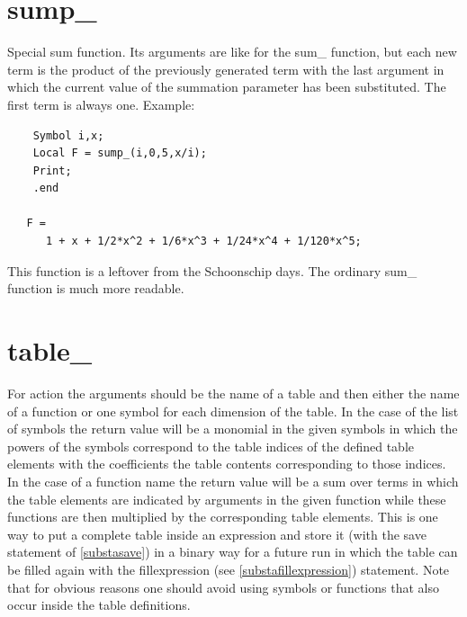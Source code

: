 
\section{sump\_}
\label{funsump}
\noindent Special sum function. Its arguments are like for the 
sum\_ function, but each new term is the product of the previously 
generated term with the last argument in which the current value of the 
summation parameter has been substituted. The first term is always one. 
Example:
\begin{verbatim}
    Symbol i,x;
    Local F = sump_(i,0,5,x/i);
    Print;
    .end

   F =
      1 + x + 1/2*x^2 + 1/6*x^3 + 1/24*x^4 + 1/120*x^5;
\end{verbatim}
This function is a leftover from the Schoonschip days. 
The ordinary sum\_ function is much more readable.


\section{table\_}
\label{funtable}
\noindent For action the arguments should be the name of a table and then 
either the name of a function or one symbol for each dimension of the 
table. In the case of the list of symbols the return value will be a 
monomial in the given symbols in which the powers of the symbols correspond 
to the table indices of the defined table elements with the coefficients 
the table contents corresponding to those indices. In the case of a 
function name the return value will be a sum over terms in which the table 
elements are indicated by arguments in the given function while these 
functions are then multiplied by the corresponding table elements. This is 
one way to put a complete table inside an expression and store it (with the 
save statement of \ref{substasave}) in a binary way for a future run in 
which the table can be filled again with the 
fillexpression (see \ref{substafillexpression}) 
statement. Note that for obvious reasons one should avoid using symbols or 
functions that also occur inside the table definitions.



